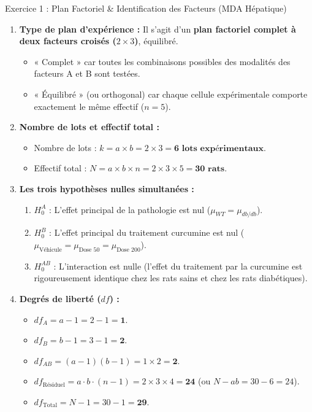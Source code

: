 \documentclass[11pt,a4paper]{article}
\begin{document}

\begin{solutionbox}{Exercice 1 : Plan Factoriel \& Identification des Facteurs (MDA Hépatique)}
\begin{enumerate}[label=\textbf{\alph*.}]
  \item \textbf{Type de plan d'expérience :}
  Il s'agit d'un \textbf{plan factoriel complet à deux facteurs croisés ($2 \times 3$)}, équilibré.
  \begin{itemize}
    \item « Complet » car toutes les combinaisons possibles des modalités des facteurs A et B sont testées.
    \item « Équilibré » (ou orthogonal) car chaque cellule expérimentale comporte exactement le même effectif ($n = 5$).
  \end{itemize}

  \item \textbf{Nombre de lots et effectif total :}
  \begin{itemize}
    \item Nombre de lots : $k = a \times b = 2 \times 3 = \mathbf{6\text{ lots expérimentaux}}$.
    \item Effectif total : $N = a \times b \times n = 2 \times 3 \times 5 = \mathbf{30\text{ rats}}$.
  \end{itemize}

  \item \textbf{Les trois hypothèses nulles simultanées :}
  \begin{enumerate}
    \item $H_0^A$ : L'effet principal de la pathologie est nul ($\mu_{WT} = \mu_{db/db}$).
    \item $H_0^B$ : L'effet principal du traitement curcumine est nul ($\mu_{\text{Véhicule}} = \mu_{\text{Dose 50}} = \mu_{\text{Dose 200}}$).
    \item $H_0^{AB}$ : L'interaction est nulle (l'effet du traitement par la curcumine est rigoureusement identique chez les rats sains et chez les rats diabétiques).
  \end{enumerate}

  \item \textbf{Degrés de liberté ($df$) :}
  \begin{itemize}
    \item $df_A = a - 1 = 2 - 1 = \mathbf{1}$.
    \item $df_B = b - 1 = 3 - 1 = \mathbf{2}$.
    \item $df_{AB} = (a - 1)(b - 1) = 1 \times 2 = \mathbf{2}$.
    \item $df_{\text{Résiduel}} = a \cdot b \cdot (n - 1) = 2 \times 3 \times 4 = \mathbf{24}$ (ou $N - ab = 30 - 6 = 24$).
    \item $df_{\text{Total}} = N - 1 = 30 - 1 = \mathbf{29}$.
  \end{itemize}
\end{enumerate}
\end{solutionbox}
\end{document}
